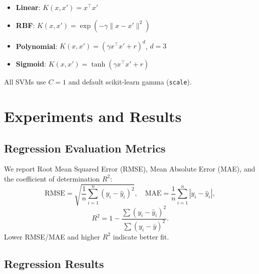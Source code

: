 \documentclass[conference]{IEEEtran}
\begin{document}
\begin{itemize}
  \item \textbf{Linear}: $K(x,x') = x^\top x'$
  \item \textbf{RBF}: $K(x,x') = \exp(-\gamma\|x-x'\|^2)$
  \item \textbf{Polynomial}: $K(x,x') = (\gamma x^\top x' + r)^d$, $d=3$
  \item \textbf{Sigmoid}: $K(x,x') = \tanh(\gamma x^\top x' + r)$
\end{itemize}

All SVMs use $C = 1$ and default scikit-learn gamma (\texttt{scale}).

\section{Experiments and Results}\label{sec:experiments}

\subsection{Regression Evaluation Metrics}

We report Root Mean Squared Error (RMSE), Mean Absolute Error (MAE), and the
coefficient of determination $R^2$:
\begin{equation}
  \text{RMSE} = \sqrt{\frac{1}{n}\sum_{i=1}^{n}(y_i - \hat{y}_i)^2}, \quad
  \text{MAE}  = \frac{1}{n}\sum_{i=1}^{n}|y_i - \hat{y}_i|,
  \label{eq:reg_metrics}
\end{equation}
\begin{equation}
  R^2 = 1 - \frac{\sum(y_i-\hat{y}_i)^2}{\sum(y_i-\bar{y})^2}.
  \label{eq:r2}
\end{equation}
Lower RMSE/MAE and higher $R^2$ indicate better fit.

\subsection{Regression Results}
\end{document}
